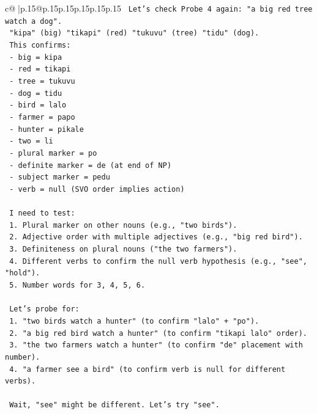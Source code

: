 \documentclass{article}
\begin{document}
{\begin{supertabular}{c@{$\;$}|p{.15\linewidth}@{}p{.15\linewidth}p{.15\linewidth}p{.15\linewidth}p{.15\linewidth}p{.15\linewidth}}
{{{\texttt{    Let's check Probe 4 again: "a big red tree watch a dog".} \\
\texttt{    "kipa" (big) "tikapi" (red) "tukuvu" (tree) "tidu" (dog).} \\
\texttt{    This confirms:} \\
\texttt{    {-} big = kipa} \\
\texttt{    {-} red = tikapi} \\
\texttt{    {-} tree = tukuvu} \\
\texttt{    {-} dog = tidu} \\
\texttt{    {-} bird = lalo} \\
\texttt{    {-} farmer = papo} \\
\texttt{    {-} hunter = pikale} \\
\texttt{    {-} two = li} \\
\texttt{    {-} plural marker = po} \\
\texttt{    {-} definite marker = de (at end of NP)} \\
\texttt{    {-} subject marker = pedu} \\
\texttt{    {-} verb = null (SVO order implies action)} \\
\\ 
\texttt{    I need to test:} \\
\texttt{    1. Plural marker on other nouns (e.g., "two birds").} \\
\texttt{    2. Adjective order with multiple adjectives (e.g., "big red bird").} \\
\texttt{    3. Definiteness on plural nouns ("the two farmers").} \\
\texttt{    4. Different verbs to confirm the null verb hypothesis (e.g., "see", "hold").} \\
\texttt{    5. Number words for 3, 4, 5, 6.} \\
\\ 
\texttt{    Let's probe for:} \\
\texttt{    1. "two birds watch a hunter" (to confirm "lalo" + "po").} \\
\texttt{    2. "a big red bird watch a hunter" (to confirm "tikapi lalo" order).} \\
\texttt{    3. "the two farmers watch a hunter" (to confirm "de" placement with number).} \\
\texttt{    4. "a farmer see a bird" (to confirm verb is null for different verbs).} \\
\\ 
\texttt{    Wait, "see" might be different. Let's try "see".} \\
}}}
\end{supertabular}}
\end{document}
